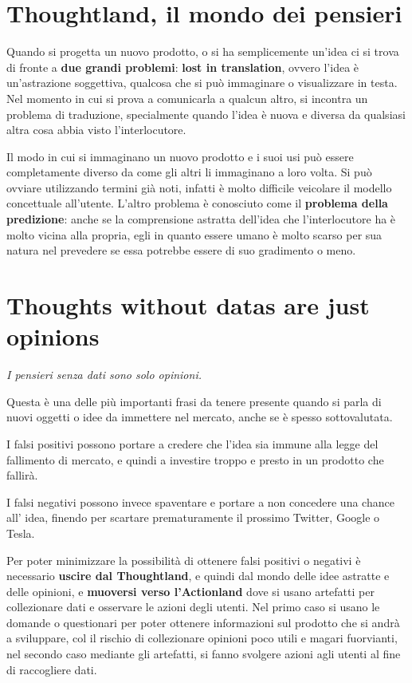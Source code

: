 \documentclass[a4paper,11pt,oneside]{book}
\begin{document}
\section{Thoughtland, il mondo dei pensieri}
Quando si progetta un nuovo prodotto, o si ha semplicemente un'idea ci si trova di fronte a \textbf{due grandi problemi}: \textbf{lost in translation}, ovvero l'idea è un'astrazione soggettiva, qualcosa che si può immaginare o visualizzare in testa. Nel momento in cui si prova a comunicarla a qualcun altro, si incontra un problema
di traduzione, specialmente quando l'idea è nuova e diversa da qualsiasi altra cosa
abbia visto l'interlocutore.

Il modo in cui si immaginano un nuovo prodotto e i suoi usi può essere completamente diverso da come gli altri li immaginano a loro volta. Si può ovviare utilizzando termini già noti, infatti è molto difficile veicolare il modello concettuale all'utente. L'altro problema è conosciuto come il \textbf{problema della predizione}: anche se la comprensione astratta dell'idea che l'interlocutore ha è molto vicina alla propria, egli in quanto essere umano è molto scarso per sua natura nel prevedere se essa potrebbe essere di suo gradimento o meno.

\pagebreak

\section{Thoughts without datas are just opinions}

\begin{flushleft}
	\textit{I pensieri senza dati sono solo opinioni.}
\end{flushleft}

Questa è una delle più importanti frasi da tenere presente quando si parla di nuovi oggetti o idee da immettere nel mercato, anche se è spesso sottovalutata.

I falsi positivi possono portare a credere che l'idea sia immune alla legge del
fallimento di mercato, e quindi a investire troppo e presto in un prodotto che fallirà.

I falsi negativi possono invece spaventare e portare a non concedere una chance all'
idea, finendo per scartare prematuramente il prossimo Twitter, Google o Tesla.

Per poter minimizzare la possibilità di ottenere falsi positivi o negativi è necessario \textbf{uscire dal Thoughtland}, e quindi dal mondo delle idee astratte e delle opinioni, e \textbf{muoversi verso l'Actionland} dove si usano artefatti per collezionare dati e osservare le azioni degli utenti. Nel primo caso si usano le domande o questionari per poter ottenere informazioni sul prodotto
che si andrà a sviluppare, col il rischio di collezionare opinioni poco utili e magari fuorvianti, nel secondo caso mediante gli artefatti, si fanno svolgere azioni agli utenti al fine di raccogliere dati.
\end{document}

